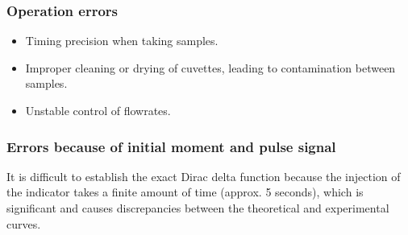 \subsubsection{Operation errors}
\begin{itemize}
    \item Timing precision when taking samples.
    \item Improper cleaning or drying of cuvettes, leading to contamination between samples.
    \item Unstable control of flowrates.
\end{itemize}

\subsubsection{Errors because of initial moment and pulse signal}
It is difficult to establish the exact Dirac delta function because the injection of the indicator takes a finite amount of time (approx. 5 seconds), which is significant and causes discrepancies between the theoretical and experimental curves.
